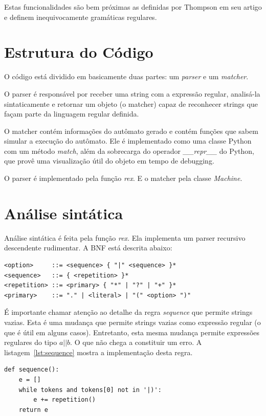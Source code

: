 \documentclass[a4paper,12pt,oneside,onecolumn]{uerj}
\begin{document}
Estas funcionalidades são bem próximas as definidas por Thompson \cite{bib:Thompson68} em seu artigo e definem inequivocamente gramáticas regulares.

\section{Estrutura do Código}

O código está dividido em basicamente duas partes: um \emph{parser} e um \emph{matcher}.

O parser é responsável por receber uma string com a expressão regular, analisá-la sintaticamente e retornar um objeto (o matcher) capaz de reconhecer strings que façam parte da linguagem regular definida.

O matcher contém informações do autômato gerado e contém funções que sabem simular a execução do autômato. Ele é implementado como uma classe Python com um método \emph{match}, além da sobrecarga do operador \emph{\_\_repr\_\_} do Python, que provê uma visualização útil do objeto em tempo de debugging.

O parser é implementado pela função \emph{rex}. E o matcher pela classe \emph{Machine}.


\section{Análise sintática}

Análise sintática é feita pela função \emph{rex}. Ela implementa um parser recursivo descendente rudimentar. A BNF está descrita abaixo:

\begin{verbatim}
<option>     ::= <sequence> { "|" <sequence> }*
<sequence>   ::= { <repetition> }*
<repetition> ::= <primary> { "*" | "?" | "+" }*
<primary>    ::= "." | <literal> | "(" <option> ")"
\end{verbatim}

É importante chamar atenção ao detalhe da regra \emph{sequence} que permite strings vazias. Esta é uma mudança que permite strings vazias como expressão regular (o que é útil em alguns casos). Entretanto, esta mesma mudança permite expressões regulares do tipo $a||b$. O que não chega a constituir um erro. A listagem~\ref{lst:sequence} mostra a implementação desta regra.

\vspace{0.5cm}
\begin{lstlisting}[caption={Implementação da regra \emph{sequence}},label=lst:sequence]
def sequence():
    e = []
    while tokens and tokens[0] not in '|)':
        e += repetition()
    return e
\end{lstlisting}
\end{document}
